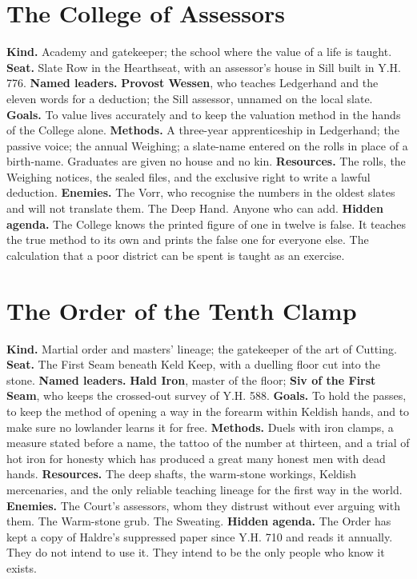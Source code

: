 \documentclass{design/chronicle}
\begin{document}
\section*{The College of Assessors}

\textbf{Kind.} Academy and gatekeeper; the school where the value of a life is taught. \textbf{Seat.} Slate Row in the Hearthseat, with an assessor’s house in Sill built in Y.H. 776. \textbf{Named leaders.} \textbf{Provost Wessen}, who teaches Ledgerhand and the eleven words for a deduction; the Sill assessor, unnamed on the local slate. \textbf{Goals.} To value lives accurately and to keep the valuation method in the hands of the College alone. \textbf{Methods.} A three-year apprenticeship in Ledgerhand; the passive voice; the annual Weighing; a slate-name entered on the rolls in place of a birth-name. Graduates are given no house and no kin. \textbf{Resources.} The rolls, the Weighing notices, the sealed files, and the exclusive right to write a lawful deduction. \textbf{Enemies.} The Vorr, who recognise the numbers in the oldest slates and will not translate them. The Deep Hand. Anyone who can add. \textbf{Hidden agenda.} The College knows the printed figure of one in twelve is false. It teaches the true method to its own and prints the false one for everyone else. The calculation that a poor district can be spent is taught as an exercise.

\section*{The Order of the Tenth Clamp}

\textbf{Kind.} Martial order and masters’ lineage; the gatekeeper of the art of Cutting. \textbf{Seat.} The First Seam beneath Keld Keep, with a duelling floor cut into the stone. \textbf{Named leaders.} \textbf{Hald Iron}, master of the floor; \textbf{Siv of the First Seam}, who keeps the crossed-out survey of Y.H. 588. \textbf{Goals.} To hold the passes, to keep the method of opening a way in the forearm within Keldish hands, and to make sure no lowlander learns it for free. \textbf{Methods.} Duels with iron clamps, a measure stated before a name, the tattoo of the number at thirteen, and a trial of hot iron for honesty which has produced a great many honest men with dead hands. \textbf{Resources.} The deep shafts, the warm-stone workings, Keldish mercenaries, and the only reliable teaching lineage for the first way in the world. \textbf{Enemies.} The Court’s assessors, whom they distrust without ever arguing with them. The Warm-stone grub. The Sweating. \textbf{Hidden agenda.} The Order has kept a copy of Haldre’s suppressed paper since Y.H. 710 and reads it annually. They do not intend to use it. They intend to be the only people who know it exists.
\end{document}

